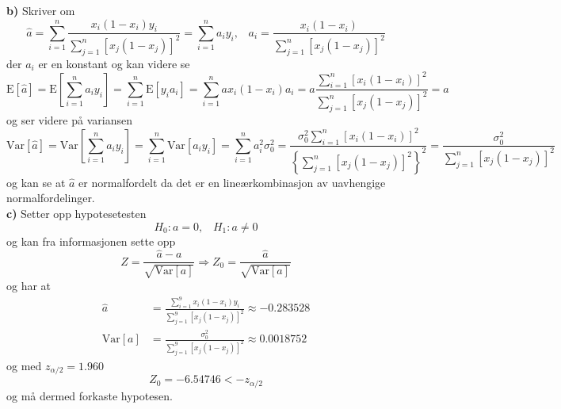 \documentclass{report}
\newcommand{\bbrack}[1]{\left[ #1 \right]}
\newcommand{\cbrack}[1]{\left\lbrace #1 \right\rbrace}
\newcommand{\Var}[1]{\text{Var} \bbrack{ #1 }}
\newcommand{\fvv}[1]{\text{E} \bbrack{ #1 }}
\begin{document}
\textbf{b)}
Skriver om
\begin{equation}
  \label{eq:18}
  \widehat{a} = \sum_{i=1}^{n}  \frac{x_{i}(1 - x_{i})y_{i} }{ \sum_{j=1}^{n} \bbrack{ x_{j} (1-x_{j}) }^{2} } = \sum_{i=1}^{n} a_{i} y_{i}, \;\;\; a_{i} = \frac{x_{i}(1 - x_{i})}{ \sum_{j=1}^{n} \bbrack{ x_{j} (1-x_{j}) }^{2} }
\end{equation}
der $a_{i}$ er en konstant og kan videre se
\begin{equation}
  \label{eq:17}
  \fvv{\widehat{a}} = \fvv{ \sum_{i=1}^{n} a_{i} y_{i} } = \sum_{i=1}^{n} \fvv{ y_{i} a_{i} } = \sum_{i=1}^{n}ax_{i}(1-x_{i}) a_{i} = a \frac{ \sum_{i=1}^{n} \bbrack{ x_{i}(1-x_{i}) }^{2} }{ \sum_{j=1}^{n} \bbrack{ x_{j}(1-x_{j}) }^{2} } = a
\end{equation}
og ser videre på variansen
\begin{equation}
  \label{eq:19}
  \Var{ \widehat{a} } = \Var{ \sum_{i=1}^{n} a_{i} y_{i} } = \sum_{i=1}^{n} \Var{ a_{i} y_{i} } = \sum_{i=1}^{n} a_{i}^{2} \sigma_{0}^{2} = \frac{\sigma_{0}^{2} \sum_{i=1}^{n} \bbrack{x_{i}(1 - x_{i})}^{2}}{ \cbrack{ \sum_{j=1}^{n} \bbrack{ x_{j} (1-x_{j}) }^{2} }^{2} } = \frac{\sigma_{0}^{2}}{ \sum_{j=1}^{n} \bbrack{ x_{j}(1-x_{j}) }^{2} }
\end{equation}
og kan se at $\widehat{a}$ er normalfordelt da det er en lineærkombinasjon av uavhengige normalfordelinger. \\

\textbf{c)}
Setter opp hypotesetesten
\begin{equation}
  \label{eq:20}
  H_{0} : a = 0, \;\;\; H_{1} : a \neq 0
\end{equation}
og kan fra informasjonen sette opp
\begin{equation}
  \label{eq:21}
  Z = \frac{\widehat{a} - a}{\sqrt{\Var{a}}} \Rightarrow Z_{0} = \frac{\widehat{a}}{\sqrt{\Var{a}}}
\end{equation}
og har at
\begin{equation}
  \label{eq:22}
  \begin{split}
    \widehat{a} &= \frac{\sum_{i=1}^{9} x_{i}(1-x_{i})y_{i} }{ \sum_{j=1}^{9} \bbrack{ x_{j} (1-x_{j}) }^{2} } \approx -0.283528 \\
    \Var{a} &= \frac{\sigma_{0}^{2}}{\sum_{j=1}^{9} \bbrack{ x_{j}(1-x_{j}) }^{2}} \approx 0.0018752
  \end{split}
\end{equation}
og med $z_{\alpha / 2} = 1.960$
\begin{equation}
  \label{eq:24}
  Z_{0} = -6.54746 < -z_{\alpha / 2}
\end{equation}
og må dermed forkaste hypotesen.
\end{document}
